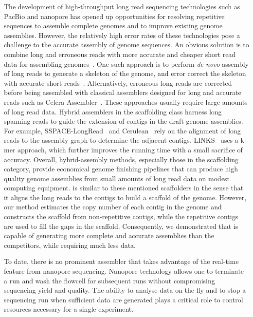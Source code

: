 The development of high-throughput long read sequencing technologies such as 
PacBio and nanopore has opened up opportunities for resolving repetitive 
sequences to assemble complete genomes and to improve existing genome assemblies.
However, the relatively high error rates of these technologies pose a challenge
to the accurate assembly of genome sequences. 
An obvious solution is to combine long and erroneous reads with more
accurate and cheaper short read data for assembling genomes~\cite{KorenSW2012,
BashirKR2013}. 
One such approach is to perform \emph{de novo} assembly of long
reads to generate a skeleton of the genome, and error correct the skeleton with
accurate short reads~\cite{BerlinKC2015, Li2016}. Alternatively, erroneous
long reads are corrected~\cite{KorenSW2012, BashirKR2013, GoodwinGE2015,
MadouiEC2015} before being assembled with classical assemblers designed for long
and accurate reads such as Celera Assembler~\cite{MyersSD2000}.
These approaches usually require large amounts of long read data.
Hybrid assemblers in the scaffolding class harness long spanning reads to guide
the extension of contigs in the draft genome assemblies. For example,
SSPACE-LongRead~\cite{BoetzerP2014} and Cerulean~\cite{DeshpandeFP2013} rely
on the alignment of long reads to the assembly graph to determine the adjacent
contigs. LINKS~\cite{WarrenYV2015} uses a k-mer approach, which further
improves the running time with a small sacrifice of accuracy.
Overall, hybrid-assembly methods, especially those in the scaffolding category,
provide economical genome finishing pipelines that can produce high quality
genome assemblies from small amounts of long read data on modest computing 
equipment.
\npscarf{} is similar to these mentioned scaffolders in the sense that it aligns
the long reads to the contigs to build a scaffold of the genome.
However, our method estimates the copy number
of each contig in the genome and constructs the scaffold from non-repetitive 
contigs, while the repetitive contigs are used to fill the gaps in the scaffold.
Consequently, we demonstrated that \npscarf{} is capable of generating more
complete and accurate assemblies than the competitors, while requiring much
less data.

 

To date, there is no prominent assembler that takes advantage of the
real-time feature from nanopore sequencing. Nanopore technology allows one to 
terminate a run and wash the flowcell for
subsequent runs without compromising sequencing yield and quality.
The ability to analyse data on the fly and to stop a sequencing run when
sufficient data are generated plays a critical role to control resources
necessary for a single experiment.


